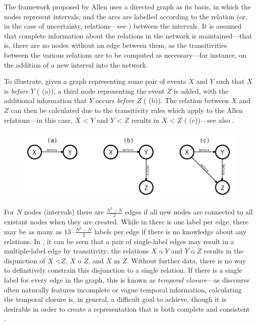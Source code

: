 \documentclass[a4paper,12pt,leqno,twoside]{article}
\begin{document}
The framework proposed by Allen uses a directed graph as its basis, in which the nodes represent intervals, and the arcs are labelled according to the relation (or, in the case of uncertainty, relations---see ) between the intervals. It is assumed that complete information about the relations in the network is maintained---that is, there are no nodes without an edge between them, as the transitivities between the various relations are to be computed as necessary---for instance, on the addition of a new interval into the network.

To illustrate, given a graph representing some pair of events $X$ and $Y$ such that $X$ is \textit{before} $Y$ ( (a)), a third node representing the event $Z$ is added, with the additional information that $Y$ occurs \textit{before} $Z$ ( (b)). The relation between $X$ and $Z$ can then be calculated due to the transitivity rules which apply to the Allen relations---in this case, $X$ \textless{} $Y$ and $Y$ \textless{} $Z$ results in $X$ \textless{} $Z$ ( (c))---see also .
\begin{center}
	\begin{figure}[h!]
		\includegraphics[width=\textwidth]{images/simple-transitivity}
		\label{fig:simple-transitivity}
	\end{figure}
\end{center}
For $N$ nodes (intervals) there are $\frac{N^2-N}{2}$ edges if all new nodes are connected to all existant nodes when they are created. While in  there is one label per edge, there may be as many as $13 \cdot \frac{N^2-N}{2}$ labels per edge if there is no knowledge about any relations. In , it can be seen that a pair of single-label edges may result in a multiple-label edge by transitivity: the relations $X$ o $Y$ and $Y$ o $Z$ results in the disjunction of $X$ \textless $Z$, $X$ o $Z$, and $X$ m $Z$. Without further data, there is no way to definitively constrain this disjunction to a single relation. If there is a single label for every edge in the graph, this is known as \textit{temporal closure}---as discourse often naturally features incomplete or vague temporal information, calculating the temporal closure is, in general, a difficult goal to achieve, though it is desirable in order to create a representation that is both complete and consistent \citep{Verhagen2005}.
\end{document}
